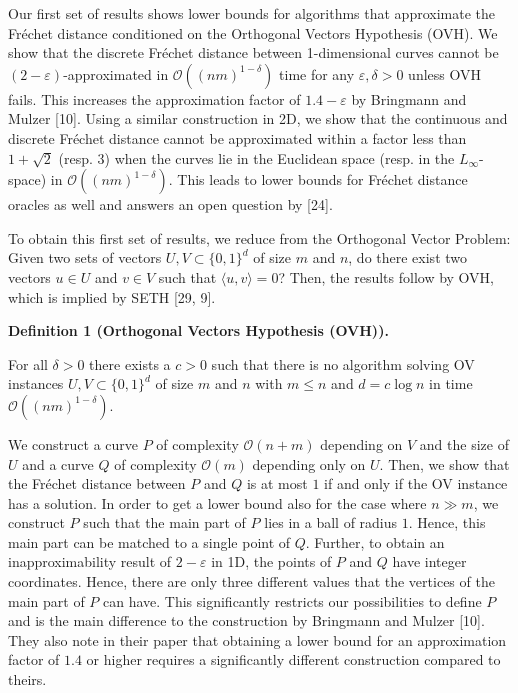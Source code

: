 Our first set of results shows lower bounds for algorithms that approximate the Fréchet distance conditioned on the Orthogonal Vectors Hypothesis (OVH). We show that the discrete Fréchet distance between 1-dimensional curves cannot be $(2-\varepsilon)$-approximated in $\mathcal{O}((nm)^{1-\delta})$ time for any $\varepsilon,\delta>0$ unless OVH fails. This increases the approximation factor of $1.4-\varepsilon$ by Bringmann and Mulzer [10]. Using a similar construction in 2D, we show that the continuous and discrete Fréchet distance cannot be approximated within a factor less than $1+\sqrt{2}$ (resp. $3$) when the curves lie in the Euclidean space (resp. in the $L_{\infty}$-space) in $\mathcal{O}((nm)^{1-\delta})$. This leads to lower bounds for Fréchet distance oracles as well and answers an open question by [24].
\par
\par
To obtain this first set of results, we reduce from the Orthogonal Vector Problem: Given two sets of vectors $U,V\subset\{0,1\}^{d}$ of size $m$ and $n$, do there exist two vectors $u\in U$ and $v\in V$ such that $\langle u,v\rangle=0$? Then, the results follow by OVH, which is implied by SETH [29, 9].
\par
\par
\par\medskip\noindent\textbf{Definition 1 (Orthogonal Vectors Hypothesis (OVH)).}\par
For all $\delta>0$ there exists a $c>0$ such that there is no algorithm solving OV instances $U,V\subset\{0,1\}^{d}$ of size $m$ and $n$ with $m\leq n$ and $d=c\log n$ in time $\mathcal{O}((nm)^{1-\delta})$.
\par
\par
\par
We construct a curve $P$ of complexity $\mathcal{O}(n+m)$ depending on $V$ and the size of $U$ and a curve $Q$ of complexity $\mathcal{O}(m)$ depending only on $U$. Then, we show that the Fréchet distance between $P$ and $Q$ is at most $1$ if and only if the OV instance has a solution. In order to get a lower bound also for the case where $n\gg m$, we construct $P$ such that the main part of $P$ lies in a ball of radius $1$. Hence, this main part can be matched to a single point of $Q$. Further, to obtain an inapproximability result of $2-\varepsilon$ in 1D, the points of $P$ and $Q$ have integer coordinates. Hence, there are only three different values that the vertices of the main part of $P$ can have. This significantly restricts our possibilities to define $P$ and is the main difference to the construction by Bringmann and Mulzer [10]. They also note in their paper that obtaining a lower bound for an approximation factor of $1.4$ or higher requires a significantly different construction compared to theirs.
